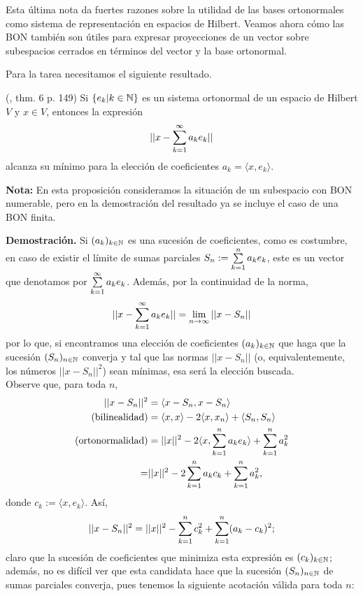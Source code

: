 Esta última nota da fuertes razones sobre la utilidad
de las bases ortonormales como sistema de representación
en espacios de Hilbert. Veamos ahora cómo
las BON también son útiles para expresar proyecciones
de un vector sobre subespacios cerrados en términos del
vector y la base ortonormal. 

Para la tarea necesitamos el siguiente resultado.


\begin{prop} \label{teo: Kol 6, p.149}
(\cite{kolmogorov}, thm. 6 p. 149)
Si $\{ e_{k} |k \in \mathbb{N} \}$ es un sistema
ortonormal de un espacio de Hilbert $V$ 
y $x \in V$, entonces la expresión
\[
|| x - \sum\limits_{k=1}^{\infty}a_{k}e_{k}  ||
\]
alcanza su mínimo para la elección de coeficientes
$a_{k}= \langle x , e_{k} \rangle $.
\end{prop}

\noindent
\textbf{Nota:}
En esta proposición consideramos la situación de un subespacio
con BON numerable, pero en la demostración del resultado ya
se incluye el caso de una BON finita.

\noindent
\textbf{Demostración.}
Si $(a_{k})_{k \in \mathbb{N}}$ es una sucesión de coeficientes,
como es costumbre,
en caso de existir el límite de sumas parciales
$S_{n}:= \sum\limits_{k=1}^{n}a_{k}e_{k}$, este es un vector que denotamos
por $\sum\limits_{k=1}^{\infty}a_{k}e_{k}$. Además,
por la continuidad de la norma,
\[
||x - \sum\limits_{k=1}^{\infty}a_{k}e_{k} || = \lim\limits_{n \rightarrow \infty }{||x-S_{n}||}
\]
por lo que, si encontramos una elección de coeficientes $(a_{k})_{k \in \mathbb{N}}$
que haga que
la sucesión $(S_{n})_{n \in \mathbb{N}}$ converja y tal que las normas
$||x-S_{n}||$ (o, equivalentemente, los números $||x-S_{n}||^{2}$)
sean mínimas, esa será la elección buscada. \\
Observe que, para toda $n$,
\begin{align*}
||x-S_{n}||^{2} & = \langle x-S_{n} , x-S_{n} \rangle \\
\text{(bilinealidad)} & = \langle x, x \rangle - 2 \langle x, x_{n} \rangle + 
\langle S_{n} , S_{n} \rangle \\
\text{(ortonormalidad)} & =  ||x||^{2} - 
2 \langle x ,\sum\limits_{k=1}^{n}a_{k}e_{k} \rangle + 
\sum\limits_{k=1}^{n}a_{k}^{2} \\
= & ||x||^{2} - 2\sum\limits_{k=1}^{n}a_{k}c_{k}  + 
\sum\limits_{k=1}^{n}a_{k}^{2},
\end{align*}
donde $c_{k}:= \langle x , e_{k} \rangle $. Así,
\[
||x-S_{n}||^{2} = ||x||^{2} - \sum\limits_{k=1}^{n}c_{k}^{2}  + 
\sum\limits_{k=1}^{n}(a_{k}-c_{k})^{2};
\]
claro que la sucesión de coeficientes que minimiza
esta expresión es $(c_{k})_{k \in \mathbb{N}}$; además, no es difícil ver
que esta candidata hace que la sucesión $(S_{n})_{n \in \mathbb{N}}$
de sumas parciales converja, pues tenemos la siguiente acotación
válida para toda $n$:

